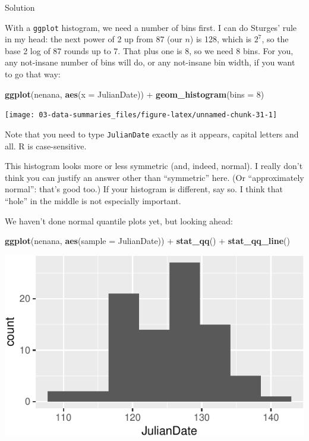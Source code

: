 \documentclass[]{tufte-book}
\newenvironment{Shaded}{}{}
\newcommand{\DataTypeTok}[1]{\textcolor[rgb]{0.56,0.13,0.00}{#1}}
\newcommand{\DecValTok}[1]{\textcolor[rgb]{0.25,0.63,0.44}{#1}}
\newcommand{\KeywordTok}[1]{\textcolor[rgb]{0.00,0.44,0.13}{\textbf{#1}}}
\newcommand{\NormalTok}[1]{#1}
\newcommand{\OperatorTok}[1]{\textcolor[rgb]{0.40,0.40,0.40}{#1}}
\newcommand{\StringTok}[1]{\textcolor[rgb]{0.25,0.44,0.63}{#1}}
\theoremstyle{definition}
\theoremstyle{definition}
\theoremstyle{definition}
\theoremstyle{remark}
\begin{document}
Solution

With a \texttt{ggplot} histogram, we need a number of bins first. I can
do Sturges' rule in my head: the next power of 2 up from 87 (our \(n\))
is 128, which is \(2^7\), so the base 2 log of 87 rounds up to 7. That
plus one is 8, so we need 8 bins. For you, any not-insane number of bins
will do, or any not-insane bin width, if you want to go that way:

\begin{Shaded}
\begin{Highlighting}[]
\KeywordTok{ggplot}\NormalTok{(nenana, }\KeywordTok{aes}\NormalTok{(}\DataTypeTok{x =}\NormalTok{ JulianDate)) }\OperatorTok{+}\StringTok{ }\KeywordTok{geom_histogram}\NormalTok{(}\DataTypeTok{bins =} \DecValTok{8}\NormalTok{)}
\end{Highlighting}
\end{Shaded}

\texttt{[image: 03-data-summaries\_files/figure-latex/unnamed-chunk-31-1]}

Note that you need to type \texttt{JulianDate} exactly as it appears,
capital letters and all. R is case-sensitive.

This histogram looks more or less symmetric (and, indeed, normal). I
really don't think you can justify an answer other than ``symmetric''
here. (Or ``approximately normal'': that's good too.) If your histogram
is different, say so. I think that ``hole'' in the middle is not
especially important.

We haven't done normal quantile plots yet, but looking ahead:

\begin{Shaded}
\begin{Highlighting}[]
\KeywordTok{ggplot}\NormalTok{(nenana, }\KeywordTok{aes}\NormalTok{(}\DataTypeTok{sample =}\NormalTok{ JulianDate)) }\OperatorTok{+}\StringTok{ }\KeywordTok{stat_qq}\NormalTok{() }\OperatorTok{+}\StringTok{ }
\StringTok{    }\KeywordTok{stat_qq_line}\NormalTok{()}
\end{Highlighting}
\end{Shaded}

\includegraphics{03-data-summaries_files/figure-latex/unnamed-chunk-32-1}
\end{document}
